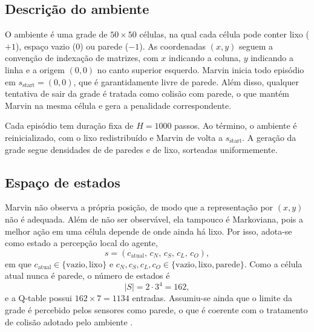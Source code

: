 \subsection{Descrição do ambiente}

O ambiente é uma grade de $50 \times 50$ células, na qual cada célula pode conter lixo ($+1$), espaço vazio ($0$) ou parede ($-1$). As coordenadas $(x, y)$ seguem a convenção de indexação de matrizes, com $x$ indicando a coluna, $y$ indicando a linha e a origem $(0,0)$ no canto superior esquerdo. Marvin inicia todo episódio em $s_{\text{start}} = (0,0)$, que é garantidamente livre de parede. Além disso, qualquer tentativa de sair da grade é tratada como colisão com parede, o que mantém Marvin na mesma célula e gera a penalidade correspondente.

Cada episódio tem duração fixa de $H = 1000$ passos. Ao término, o ambiente é reinicializado, com o lixo redistribuído e Marvin de volta a $s_{\text{start}}$. A geração da grade segue densidades de  de paredes e  de lixo, sorteadas uniformemente.


\subsection{Espaço de estados}

Marvin não observa a própria posição, de modo que a representação por $(x, y)$ não é adequada. Além de não ser observável, ela tampouco é Markoviana, pois a melhor ação em uma célula depende de onde ainda há lixo. Por isso, adota-se como estado a percepção local do agente,
\begin{equation}
    s = \left(c_{\text{atual}},\, c_N,\, c_S,\, c_L,\, c_O\right),
    \label{eq:estado}
\end{equation}
em que $c_{\text{atual}} \in \{\text{vazio}, \text{lixo}\}$ e $c_N, c_S, c_L, c_O \in \{\text{vazio}, \text{lixo}, \text{parede}\}$. Como a célula atual nunca é parede, o número de estados é
\begin{equation}
    |S| = 2 \cdot 3^4 = 162,
\end{equation}
e a Q-table possui $162 \times 7 = 1134$ entradas. Assumiu-se ainda que o limite da grade é percebido pelos sensores como parede, o que é coerente com o tratamento de colisão adotado pelo ambiente .

